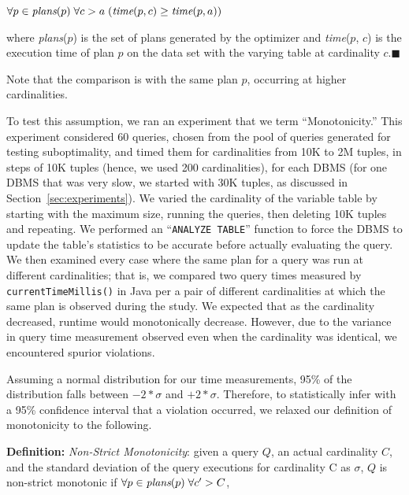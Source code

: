 \documentclass[prodmode,acmtods]{acmsmall}
\begin{document}
\quad\quad\quad\quad\quad$\forall p \in \hbox{\em plans} (p) \;\forall c > a \;( \hbox{\em time} (p,
c) \geq \hbox{\em time} (p,a) )$

\vspace{1em}\noindent
where {\em plans}($p$) is the set of plans generated by the optimizer and
{\em time}($p$, $c$) is the execution time of plan $p$ on the data set with
the varying table at cardinality $c$.\hfill$\blacksquare$

\vspace{1em}
\noindent
Note that the comparison is with the same plan $p$, occurring at higher
cardinalities.

To test this assumption, we ran an experiment that we term
``Monotonicity.'' This experiment considered 60 queries, chosen from the
pool of queries
generated for testing suboptimality, and timed them for cardinalities from 10K
to 2M tuples, in steps of 10K tuples (hence, we used 200 cardinalities), for
each \hbox{DBMS} (for one \hbox{DBMS} that was very slow, we started with 30K tuples, as
discussed in Section~\ref{sec:experiments}). We varied the cardinality of the variable table by starting with
the maximum size, running the queries, then deleting 10K tuples and repeating.
We performed an ``{\tt ANALYZE TABLE}'' function to force
the \hbox{DBMS} to update the table's statistics to be accurate before actually
evaluating the query. 
We then examined every case where the same plan for a query was run at different cardinalities; that is,
we compared two query times measured by {\tt currentTimeMillis()} in {\sc
  Java} per a pair of different cardinalities at which the same plan is
observed during the study.   We expected that as the cardinality decreased,
runtime would monotonically decrease. However, due to the variance in query
time measurement observed even when the cardinality was identical, we encountered
spurior violations.

Assuming a normal distribution for our time measurements, 95\% of 
the distribution falls between $-2*\sigma$ and $+2*\sigma$. 
Therefore, to statistically
infer with a 95\% confidence interval that a violation occurred, 
we relaxed our definition of monotonicity to the following.

\vspace{1em}\noindent
{\bf Definition:} {\em Non-Strict Monotonicity}: given a query $Q$, an actual
cardinality $C$, and the standard deviation of the query executions for
cardinality C as $\sigma$, $Q$ is non-strict monotonic if $\forall p \in
\hbox{\em plans} (p) \;\forall c^{\prime} > C $,
\end{document}

